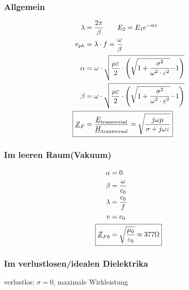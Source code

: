 \subsubsection{Allgemein}
\begin{align*}
    \lambda                 & = \dfrac{2\pi}{\beta} \qquad E_2 = E_1 e^{-\alpha z}                                                                                        \\
    v_{ph}                  & = \lambda\cdot f = \dfrac{\omega}{\beta}                                                                                                    \\
    \alpha                  & = \omega \cdot \sqrt{\dfrac{\mu \varepsilon}{2}\cdot \left(\sqrt{1+\dfrac{\sigma^2}{\omega^2\cdot\varepsilon^2}}{\color{red}{-}}1\right)}   \\
    \beta                   & = \omega \cdot \sqrt{\dfrac{\mu \varepsilon}{2}\cdot \left(\sqrt{1+\dfrac{\sigma^2}{\omega^2\cdot\varepsilon^2}}{\color{green}{+}}1\right)} \\
    \Aboxed{\underline{Z}_F & = \dfrac{\underline{E}_\text{transversal}}{\underline{H}_\text{transversal}} = \sqrt{\dfrac{j\omega\mu}{\sigma+j\omega\varepsilon}}}        \\
\end{align*}

\subsubsection{Im leeren Raum(Vakuum)}
\begin{align*}
    \alpha                     & = 0                                                    \\
    \beta                      & = \dfrac{\omega}{c_0}                                  \\
    \lambda                    & = \dfrac{c_0}{f}                                       \\
    v                          & = c_0                                                  \\
    \Aboxed{\underline{Z}_{F0} & = \sqrt{\dfrac{\mu_0}{\varepsilon_0}}\approx377\Omega}
\end{align*}

\subsubsection{Im verlustlosen/idealen Dielektrika}
verlustlos: $\sigma =0$, maximale Wirkleistung


